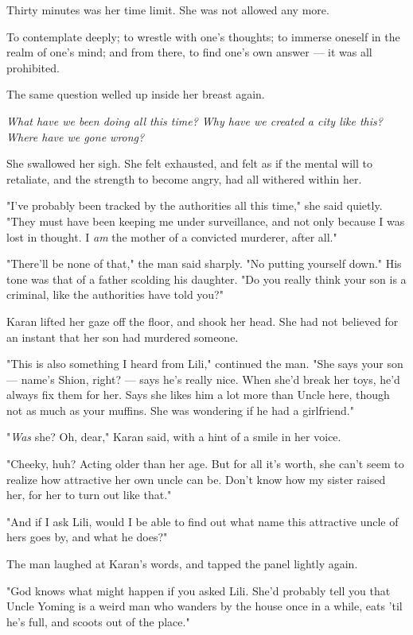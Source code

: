 Thirty minutes was her time limit. She was not allowed any more.

To contemplate deeply; to wrestle with one's thoughts; to immerse
oneself in the realm of one's mind; and from there, to find one's own
answer --- it was all prohibited.

The same question welled up inside her breast again.

\emph{What have we been doing all this time? Why have we created a city like
this? Where have we gone wrong?}

She swallowed her sigh. She felt exhausted, and felt as if the mental
will to retaliate, and the strength to become angry, had all withered
within her.

"I've probably been tracked by the authorities all this time," she said
quietly. "They must have been keeping me under surveillance, and not
only because I was lost in thought. I \emph{am} the mother of a convicted
murderer, after all."

"There'll be none of that," the man said sharply. "No putting yourself
down." His tone was that of a father scolding his daughter. "Do you
really think your son is a criminal, like the authorities have told
you?"

Karan lifted her gaze off the floor, and shook her head. She had not
believed for an instant that her son had murdered someone.

"This is also something I heard from Lili," continued the man. "She says
your son --- name's Shion, right? --- says he's really nice. When she'd
break her toys, he'd always fix them for her. Says she likes him a lot
more than Uncle here, though not as much as your muffins. She was
wondering if he had a girlfriend."

"\emph{Was} she? Oh, dear," Karan said, with a hint of a smile in her voice.

"Cheeky, huh? Acting older than her age. But for all it's worth, she
can't seem to realize how attractive her own uncle can be. Don't know
how my sister raised her, for her to turn out like that."

"And if I ask Lili, would I be able to find out what name this
attractive uncle of hers goes by, and what he does?"

The man laughed at Karan's words, and tapped the panel lightly again.

"God knows what might happen if you asked Lili. She'd probably tell you
that Uncle Yoming is a weird man who wanders by the house once in a
while, eats 'til he's full, and scoots out of the place."

